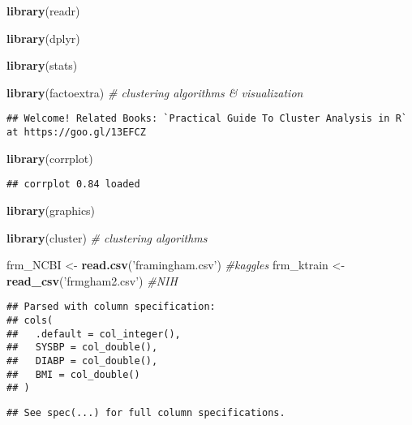 \documentclass[]{article}
\newenvironment{Shaded}{\begin{snugshade}}{\end{snugshade}}
\newcommand{\KeywordTok}[1]{\textcolor[rgb]{0.13,0.29,0.53}{\textbf{#1}}}
\newcommand{\StringTok}[1]{\textcolor[rgb]{0.31,0.60,0.02}{#1}}
\newcommand{\CommentTok}[1]{\textcolor[rgb]{0.56,0.35,0.01}{\textit{#1}}}
\newcommand{\NormalTok}[1]{#1}
\begin{document}
\begin{Shaded}
\begin{Highlighting}[]
\KeywordTok{library}\NormalTok{(readr)}

\KeywordTok{library}\NormalTok{(dplyr)}

\KeywordTok{library}\NormalTok{(stats)}

\KeywordTok{library}\NormalTok{(factoextra) }\CommentTok{# clustering algorithms & visualization}
\end{Highlighting}
\end{Shaded}

\begin{verbatim}
## Welcome! Related Books: `Practical Guide To Cluster Analysis in R` at https://goo.gl/13EFCZ
\end{verbatim}

\begin{Shaded}
\begin{Highlighting}[]
\KeywordTok{library}\NormalTok{(corrplot)}
\end{Highlighting}
\end{Shaded}

\begin{verbatim}
## corrplot 0.84 loaded
\end{verbatim}

\begin{Shaded}
\begin{Highlighting}[]
\KeywordTok{library}\NormalTok{(graphics)}

\KeywordTok{library}\NormalTok{(cluster)    }\CommentTok{# clustering algorithms}

\NormalTok{frm_NCBI <-}\StringTok{ }\KeywordTok{read.csv}\NormalTok{(}\StringTok{'framingham.csv'}\NormalTok{) }\CommentTok{#kaggles}
\NormalTok{frm_ktrain <-}\StringTok{ }\KeywordTok{read_csv}\NormalTok{(}\StringTok{'frmgham2.csv'}\NormalTok{) }\CommentTok{#NIH}
\end{Highlighting}
\end{Shaded}

\begin{verbatim}
## Parsed with column specification:
## cols(
##   .default = col_integer(),
##   SYSBP = col_double(),
##   DIABP = col_double(),
##   BMI = col_double()
## )
\end{verbatim}

\begin{verbatim}
## See spec(...) for full column specifications.
\end{verbatim}
\end{document}
